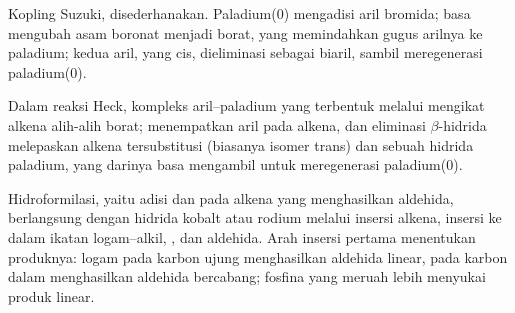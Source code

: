 \begin{omfigure}

{\small Kopling Suzuki, disederhanakan. Paladium(0) mengadisi aril bromida;
basa mengubah asam boronat menjadi borat, yang memindahkan gugus arilnya ke
paladium; kedua aril, yang cis, dieliminasi sebagai biaril, sambil
meregenerasi paladium(0).}
\end{omfigure}

Dalam reaksi Heck, kompleks aril--paladium yang terbentuk melalui  mengikat alkena alih-alih borat;  menempatkan aril
pada alkena, dan eliminasi $\beta$-hidrida melepaskan alkena tersubstitusi
(biasanya isomer trans) dan sebuah hidrida paladium, yang darinya basa
mengambil  untuk meregenerasi paladium(0).

Hidroformilasi, yaitu adisi  dan  pada alkena yang menghasilkan
aldehida, berlangsung dengan hidrida kobalt atau rodium melalui insersi
alkena, insersi  ke dalam ikatan logam--alkil,  ,
dan  aldehida. Arah insersi pertama menentukan produknya:
logam pada karbon ujung menghasilkan aldehida linear, pada karbon dalam
menghasilkan aldehida bercabang; fosfina yang meruah lebih menyukai produk
linear.

